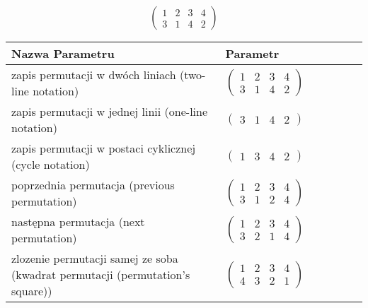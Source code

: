 \documentclass[12pt]{article}
\begin{document}
\subsection{}
\begin{center}
\[
\begin{pmatrix}
	1 & 2 & 3 & 4 \\ 
	3 & 1 & 4 & 2 
\end{pmatrix}
\]

\begin{tabular}{|m{0.6\linewidth}|m{0.4\linewidth}|}
	\hline
	Nazwa Parametru & Parametr \\
	\hline
	zapis permutacji w dwóch liniach (two-line notation) & $\begin{pmatrix} 1 & 2 & 3 & 4 \\ 
3 & 1 & 4 & 2 \end{pmatrix}$ \\ 
	\hline
	zapis permutacji w jednej linii (one-line notation) & $\begin{pmatrix} 3 & 1 & 4 & 2 \end{pmatrix}$ \\ 
	\hline
	zapis permutacji w postaci cyklicznej (cycle notation) & $\begin{pmatrix} 1 & 3 & 4 & 2 \end{pmatrix} $ \\ 
	\hline
	poprzednia permutacja (previous permutation) & $\begin{pmatrix} 1 & 2 & 3 & 4 \\ 
3 & 1 & 2 & 4 \end{pmatrix}$ \\ 
	\hline
	następna permutacja (next permutation) & $\begin{pmatrix} 1 & 2 & 3 & 4 \\ 
3 & 2 & 1 & 4 \end{pmatrix}$ \\ 
	\hline
	zlozenie permutacji samej ze soba (kwadrat permutacji (permutation's square)) & $\begin{pmatrix} 1 & 2 & 3 & 4 \\ 
4 & 3 & 2 & 1 \end{pmatrix}$ \\ 
	\hline
\end{tabular}
\end{center}
\end{document}
